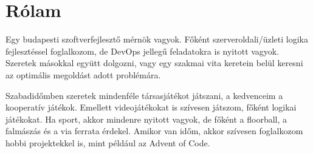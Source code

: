 \documentclass[letterpaper]{twentysecondcv} %
\begin{document}

\aboutme{}









\vspace*{-0.6cm}
\section{Rólam}

\begin{minipage}{0.95\textwidth}Egy budapesti szoftverfejlesztő mérnök vagyok. Főként szerveroldali/üzleti logika fejlesztéssel foglalkozom, de DevOps jellegű feladatokra is nyitott vagyok. Szeretek másokkal együtt dolgozni, vagy egy szakmai vita keretein belül keresni az optimális megoldást adott problémára.

	Szabadidőmben szeretek mindenféle társasjátékot játszani, a kedvenceim a kooperatív játékok. Emellett videojátékokat is szívesen játszom, főként logikai játékokat. Ha sport, akkor mindenre nyitott vagyok, de főként a floorball, a falmászás és a via ferrata érdekel. Amikor van időm, akkor szívesen foglalkozom hobbi projektekkel is, mint például az Advent of Code.
\end{minipage}
\end{document}
